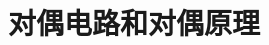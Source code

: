 \documentclass[UTF8]{report}
\theoremstyle{MyLineTheoremStyle} %
\theoremstyle{MyBlockTheoremStyle} %
\theoremstyle{MySubsubsectionStyle} %
\begin{document}
\section{对偶电路和对偶原理}
\end{document}
